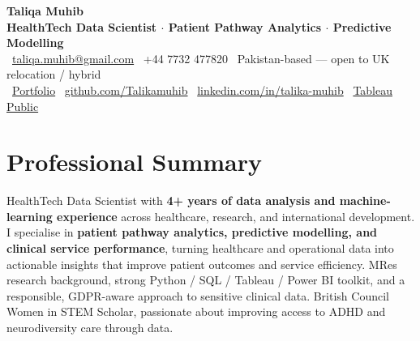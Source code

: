 \documentclass[a4paper,10pt]{article}
\begin{document}
\begin{center}
  {\Huge\bfseries\color{ink} Taliqa Muhib}\\[0.35em]
  {\color{accent}\bfseries HealthTech Data Scientist $\cdot$ Patient Pathway Analytics $\cdot$ Predictive Modelling}\\[0.5em]
  {\small
    \faEnvelope\ \href{mailto:taliqa.muhib@gmail.com}{taliqa.muhib@gmail.com} \quad
    \faPhone\ +44 7732 477820 \quad
    \faMapMarker*\ Pakistan-based --- open to UK relocation / hybrid
  }\\[0.3em]
  {\small
    \faGlobe\ \href{https://talikamuhib.github.io/Talikamuhib/}{Portfolio} \quad
    \faGithub\ \href{https://github.com/Talikamuhib}{github.com/Talikamuhib} \quad
    \faLinkedin\ \href{https://www.linkedin.com/in/talika-muhib}{linkedin.com/in/talika-muhib} \quad
    \faChartBar\ \href{https://public.tableau.com/app/profile/taliqa.muhib1820}{Tableau Public}
  }
\end{center}

\section*{Professional Summary}
HealthTech Data Scientist with \textbf{4+ years of data analysis and machine-learning
experience} across healthcare, research, and international development. I specialise in
\textbf{patient pathway analytics, predictive modelling, and clinical service performance},
turning healthcare and operational data into actionable insights that improve patient
outcomes and service efficiency. MRes research background, strong Python / SQL / Tableau /
Power BI toolkit, and a responsible, GDPR-aware approach to sensitive clinical data.
British Council Women in STEM Scholar, passionate about improving access to ADHD and
neurodiversity care through data.

\end{document}
